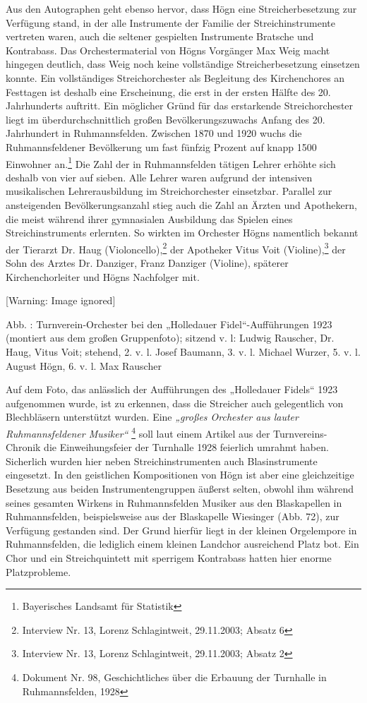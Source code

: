\documentclass[a4paper]{article}
\newcommand\textstyleZitate[1]{\textit{#1}}
\newcounter{Abb}
\renewcommand\theAbb{\arabic{Abb}}
\begin{document}
Aus den Autographen geht ebenso hervor, dass Högn eine
Streicherbesetzung zur Verfügung stand, in der alle Instrumente der
Familie der Streichinstrumente vertreten waren, auch die seltener
gespielten Instrumente Bratsche und Kontrabass. Das Orchestermaterial
von Högns Vorgänger Max Weig macht hingegen deutlich, dass Weig noch
keine vollständige Streicherbesetzung einsetzen konnte. Ein
vollständiges Streichorchester als Begleitung des Kirchenchores an
Festtagen ist deshalb eine Erscheinung, die erst in der ersten Hälfte
des 20. Jahrhunderts auftritt. Ein möglicher Gründ für das erstarkende
Streichorchester liegt im überdurchschnittlich großen
Bevölkerungszuwachs Anfang des 20. Jahrhundert in Ruhmannsfelden.
Zwischen 1870 und 1920 wuchs die Ruhmannsfeldener Bevölkerung um fast
fünfzig Prozent auf knapp 1500 Einwohner an.\footnote{ Bayerisches
Landsamt für Statistik} Die Zahl der in Ruhmannsfelden tätigen Lehrer
erhöhte sich deshalb von vier auf sieben. Alle Lehrer waren aufgrund
der intensiven musikalischen Lehrerausbildung im Streichorchester
einsetzbar. Parallel zur ansteigenden Bevölkerungsanzahl stieg auch die
Zahl an Ärzten und Apothekern, die meist während ihrer gymnasialen
Ausbildung das Spielen eines Streichinstruments erlernten. So wirkten
im Orchester Högns namentlich bekannt der Tierarzt Dr. Haug
(Violoncello),\footnote{ Interview Nr. 13, Lorenz Schlagintweit,
29.11.2003; Absatz 6} der Apotheker Vitus Voit (Violine),\footnote{
Interview Nr. 13, Lorenz Schlagintweit, 29.11.2003; Absatz 2} der Sohn
des Arztes Dr. Danziger, Franz Danziger (Violine), späterer
Kirchenchorleiter und Högns Nachfolger mit.

  [Warning: Image ignored] %
 

Abb. \stepcounter{Abb}{\theAbb}: Turnverein-Orchester bei den
„Holledauer Fidel“-Aufführungen 1923 (montiert aus dem großen
Gruppenfoto); sitzend v. l: Ludwig Rauscher, Dr. Haug, Vitus Voit;
stehend, 2. v. l. Josef Baumann, 3. v. l. Michael Wurzer, 5. v. l.
August Högn, 6. v. l. Max Rauscher

Auf dem Foto, das anlässlich der Aufführungen des „Holledauer Fidels“
1923 aufgenommen wurde, ist zu erkennen, dass die Streicher auch
gelegentlich von Blechbläsern unterstützt wurden. Eine
\textstyleZitate{„großes Orchester aus lauter Ruhmannsfeldener
Musiker“} \footnote{ Dokument Nr. 98, Geschichtliches über die Erbauung
der Turnhalle in Ruhmannsfelden, 1928} soll laut einem Artikel aus der
Turnvereins-Chronik die Einweihungsfeier der Turnhalle 1928 feierlich
umrahmt haben. Sicherlich wurden hier neben Streichinstrumenten auch
Blasinstrumente eingesetzt. In den geistlichen Kompositionen von Högn
ist aber eine gleichzeitige Besetzung aus beiden Instrumentengruppen
äußerst selten, obwohl ihm während seines gesamten Wirkens in
Ruhmannsfelden Musiker aus den Blaskapellen in Ruhmannsfelden,
beispielsweise aus der Blaskapelle Wiesinger (Abb. 72), zur Verfügung
gestanden sind. Der Grund hierfür liegt in der kleinen Orgelempore in
Ruhmannsfelden, die lediglich einem kleinen Landchor ausreichend Platz
bot. Ein Chor und ein Streichquintett mit sperrigem Kontrabass hatten
hier enorme Platzprobleme.
\end{document}
